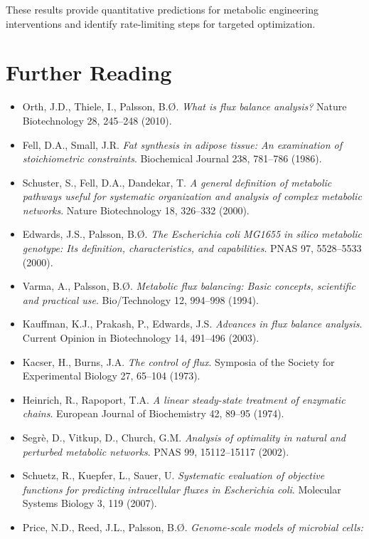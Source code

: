 \documentclass[a4paper, 11pt]{article}
\begin{document}
These results provide quantitative predictions for metabolic engineering interventions and
identify rate-limiting steps for targeted optimization.

\section*{Further Reading}

\begin{itemize}
\item Orth, J.D., Thiele, I., Palsson, B.{\O}. \textit{What is flux balance analysis?}
Nature Biotechnology 28, 245--248 (2010).
\item Fell, D.A., Small, J.R. \textit{Fat synthesis in adipose tissue: An examination of
stoichiometric constraints}. Biochemical Journal 238, 781--786 (1986).
\item Schuster, S., Fell, D.A., Dandekar, T. \textit{A general definition of metabolic pathways
useful for systematic organization and analysis of complex metabolic networks}. Nature Biotechnology
18, 326--332 (2000).
\item Edwards, J.S., Palsson, B.{\O}. \textit{The Escherichia coli MG1655 in silico metabolic
genotype: Its definition, characteristics, and capabilities}. PNAS 97, 5528--5533 (2000).
\item Varma, A., Palsson, B.{\O}. \textit{Metabolic flux balancing: Basic concepts, scientific
and practical use}. Bio/Technology 12, 994--998 (1994).
\item Kauffman, K.J., Prakash, P., Edwards, J.S. \textit{Advances in flux balance analysis}.
Current Opinion in Biotechnology 14, 491--496 (2003).
\item Kacser, H., Burns, J.A. \textit{The control of flux}. Symposia of the Society for
Experimental Biology 27, 65--104 (1973).
\item Heinrich, R., Rapoport, T.A. \textit{A linear steady-state treatment of enzymatic chains}.
European Journal of Biochemistry 42, 89--95 (1974).
\item Segr\`e, D., Vitkup, D., Church, G.M. \textit{Analysis of optimality in natural and
perturbed metabolic networks}. PNAS 99, 15112--15117 (2002).
\item Schuetz, R., Kuepfer, L., Sauer, U. \textit{Systematic evaluation of objective functions
for predicting intracellular fluxes in Escherichia coli}. Molecular Systems Biology 3, 119 (2007).
\item Price, N.D., Reed, J.L., Palsson, B.{\O}. \textit{Genome-scale models of microbial cells:
}
\end{itemize}
\end{document}
